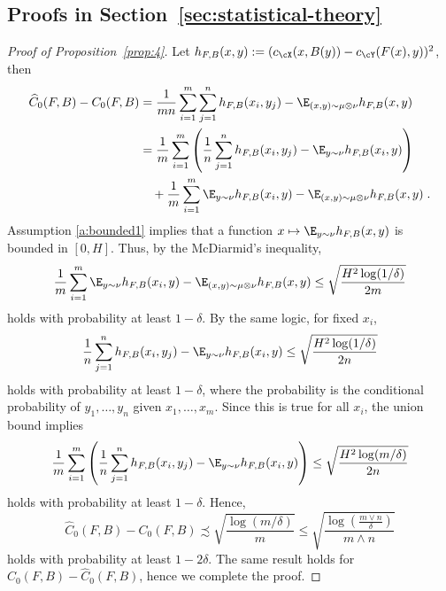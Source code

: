 \documentclass[11pt]{article}
\begin{document}
\subsection{Proofs in Section~\ref{sec:statistical-theory}}

\begin{proof}[Proof of Proposition~\ref{prop:4}]
	Let $h_{F, B}(x, y) := (c_{\cX}(x, B(y)) - c_{\cY}(F(x), y))^2$, then
	\begin{equation*}
		\begin{split}
			\widehat{C}_0(F, B) - C_0(F, B)
			& = \frac{1}{m n} \sum_{i=1}^{m} \sum_{j=1}^{n} h_{F, B}(x_i, y_j) - \E_{(x, y) \sim \mu \otimes \nu} h_{F, B}(x, y) \\
			& = \frac{1}{m} \sum_{i=1}^{m} \left(\frac{1}{n} \sum_{j=1}^{n} h_{F, B}(x_i, y_j) - \E_{y \sim \nu} h_{F, B}(x_i, y)\right) \\
			& \quad + \frac{1}{m} \sum_{i=1}^{m} \E_{y \sim \nu} h_{F, B}(x_i, y) - \E_{(x, y) \sim \mu \otimes \nu} h_{F, B}(x, y)\;.
		\end{split}
	\end{equation*}
	Assumption \ref{a:bounded1} implies that a function $x \mapsto \E_{y \sim \nu} h_{F, B}(x, y)$ is bounded in $[0, H]$. Thus, by the McDiarmid's inequality,
	\begin{equation*}
		\frac{1}{m} \sum_{i=1}^{m} \E_{y \sim \nu} h_{F, B}(x_i, y) - \E_{(x, y) \sim \mu \otimes \nu} h_{F, B}(x, y) \le \sqrt{\frac{H^2 \log(1 / \delta)}{2 m}}
	\end{equation*}
	holds with probability at least $1 - \delta$. By the same logic, for fixed $x_i$,
	\begin{equation*}
		\frac{1}{n} \sum_{j=1}^{n} h_{F, B}(x_i, y_j) - \E_{y \sim \nu} h_{F, B}(x_i, y) \le \sqrt{\frac{H^2 \log(1 / \delta)}{2 n}}
	\end{equation*}
	holds with probability at least $1 - \delta$, where the probability is the conditional probability of $y_1, \ldots, y_n$ given $x_1, \ldots, x_m$. Since this is true for all $x_i$, the union bound implies
	\begin{equation*}
		\frac{1}{m} \sum_{i=1}^{m} \left(\frac{1}{n} \sum_{j=1}^{n} h_{F, B}(x_i, y_j) - \E_{y \sim \nu} h_{F, B}(x_i, y)\right) \le \sqrt{\frac{H^2 \log(m / \delta)}{2 n}}
	\end{equation*}
	holds with probability at least $1 - \delta$. Hence,
	\begin{equation*}			
		\widehat{C}_0(F, B) - C_0(F, B)
		\precsim \sqrt{\frac{\log(m / \delta)}{m}} \le \sqrt{\frac{\log(\tfrac{m \vee n}{\delta})}{m \wedge n}}
	\end{equation*}
	holds with probability at least $1 - 2 \delta$. The same result holds for $C_0(F, B) - \widehat{C}_0(F, B)$, hence we complete the proof.
\end{proof}
\end{document}
